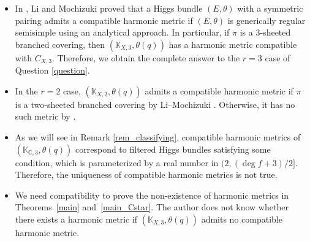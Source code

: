 \documentclass[pdftex]{sigma}
\numberwithin{equation}{section}
\newcommand{\C}{\mathbb{C}}
\begin{document}
{\samepage\begin{Remark}\quad
 \begin{itemize}\itemsep=0pt
 \item In \cite{LM1}, Li and Mochizuki proved that a Higgs bundle $(E,\theta)$ with a symmetric pairing admits a compatible harmonic metric if $(E,\theta)$ is generically regular semisimple using an analytical approach. In particular, if $\pi$ is a 3-sheeted branched covering, then $(\mathbb{K}_{X,3},\theta(q))$ has a harmonic metric compatible with $C_{X,3}$. Therefore, we obtain the complete answer to the $r=3$ case of Question \ref{question}.
 \item In the $r=2$ case, $(\mathbb{K}_{X,2},\theta(q))$ admits a compatible harmonic metric if $\pi$ is a two-sheeted branched covering by Li--Mochizuki \cite{LM1}. Otherwise, it has no such metric by \cite[Propositions~3.41 and~3.42]{LM3}.
 \item As we will see in Remark \ref{rem_classifying}, compatible harmonic metrics of $(\mathbb{K}_{\C,3},\theta(q))$ correspond to filtered Higgs bundles satisfying some condition, which is parameterized by a real number in $(2,(\deg{f}+3)/2]$. Therefore, the uniqueness of compatible harmonic metrics is not true.
 \item We need compatibility to prove the non-existence of harmonic metrics in Theorems~\ref{main} and~\ref{main_Cstar}. The author does not know whether there exists a harmonic metric if $(\mathbb{K}_{X,3},\theta(q))$ admits no compatible harmonic metric.
 \end{itemize}
\end{Remark}}
\end{document}
